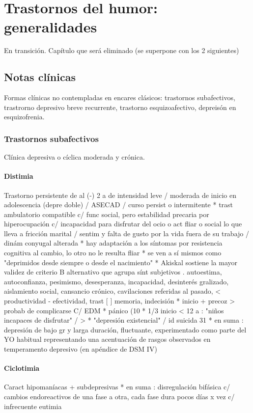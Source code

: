 \chapter{Trastornos del humor: generalidades}
\faStopCircle En transición. Capítulo que será eliminado (se superpone con los 2 siguientes)
\section*{Notas clínicas}
Formas clínicas no contempladas en encares clásicos: trastornos subafectivos, trastrorno depresivo breve recurrente, trastorno esquizoafectivo, depreisón en esquizofrenia.
\subsection*{Trastornos subafectivos}
Clínica depresiva o cíclica moderada y crónica.
\subsubsection*{Distimia}
Trastorno persistente de al (-) 2 a de intensidad leve / moderada de inicio en adolescencia (depre doble) / ASECAD / curso persist o intermitente
* trast ambulatorio compatible c/ func social, pero estabilidad precaria por hiperocupación c/ incapacidad para disfrutar del ocio o act fliar o social lo que lleva a fricción marital / sentim y falta de gusto por la vida fuera de su trabajo / dinám conyugal alterada
* hay adaptación a los síntomas por resistencia cognitiva al cambio, lo otro no le resulta fliar
* se ven a sí mismos como "deprimidos desde siempre o desde el nacimiento"
* Akiskal sostiene la mayor validez de criterio B alternativo que agrupa sínt subjetivos . autoestima, autoconfianza, pesimismo, desesperanza, incapacidad, desinterés gralizado, aislamiento social, cansancio crónico, cavilaciones referidas al pasado, < productividad - efectividad, trast [ ] memoria, indecisión
* inicio + precoz > probab de complicarse C/ EDM
* pánico (10 %
* 1/3 inicio < 12 a : "niños incapaces de disfrutar" / > %
* "depresión existencial" / id suicida 31 %
* en suma : depresión de bajo gr y larga duración, fluctuante, experimentado como parte del YO habitual representando una acentuación de rasgos observados en temperamento depresivo (en apéndice de DSM IV)
\subsubsection*{Ciclotimia}
Caract hipomaníacas + subdepresivas
* en suma : disregulación bifásica c/ cambios endoreactivos de una fase a otra, cada fase dura pocos días x vez c/ infrecuente eutimia

